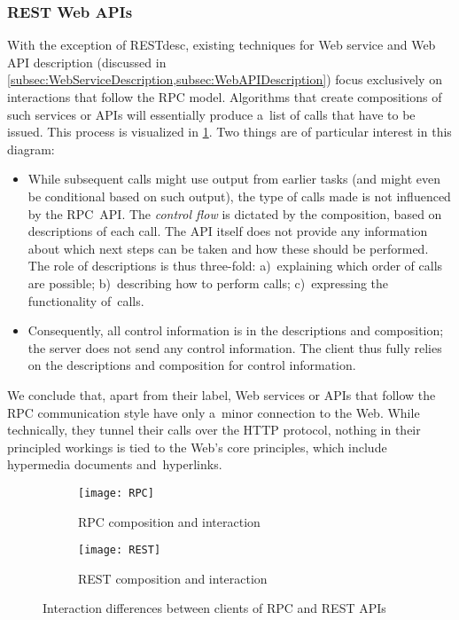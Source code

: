 \subsubsection{REST Web APIs}
\label{subsec:TechnologiesREST}
With the exception of RESTdesc,
existing techniques for Web service and Web API description
(discussed in \cref{subsec:WebServiceDescription,subsec:WebAPIDescription})
focus exclusively on interactions that follow the RPC model.
Algorithms that create compositions of such services or APIs
will essentially produce a~list of calls that have to be issued.
This process is visualized in \cref{fig:RPC}.
Two things are of particular interest in this diagram:
\begin{itemize}
  \item While subsequent calls might use output from earlier tasks
        (and might even be conditional based on such output),
        the type of calls made is not influenced by the RPC~API.
        The \emph{control flow} is dictated by the composition,
        based on descriptions of each call.
        The API itself does not provide any information
        about which next steps can be taken
        and how these should be performed.
        The role of descriptions is thus three-fold:
        a)~explaining which order of calls are possible;
        b)~describing how to perform calls;
        c)~expressing the functionality of~calls.
  \item Consequently, all control information is in the descriptions and composition;
        the server does not send any control information.
        The client thus fully relies on the descriptions and composition for control information.
\end{itemize}

We conclude that, apart from their label, Web services or APIs that follow the RPC communication style
have only a~minor connection to the Web.
While technically, they tunnel their calls over the HTTP protocol,
nothing in their principled workings is tied to the Web's core principles,
which include hypermedia documents and~hyperlinks.

\begin{figure}[t]
  \begin{subfigure}{0.46\linewidth}
    \texttt{[image: RPC]}
    \caption{RPC composition and interaction}
    \label{fig:RPC}
  \end{subfigure}
  \hfill
  \begin{subfigure}{0.46\linewidth}
    \texttt{[image: REST]}
    \caption{REST composition and interaction}
    \label{fig:REST}
  \end{subfigure}
  \caption{Interaction differences between clients of RPC and REST APIs}
  \label{fig:RPCvsREST}
\end{figure}

